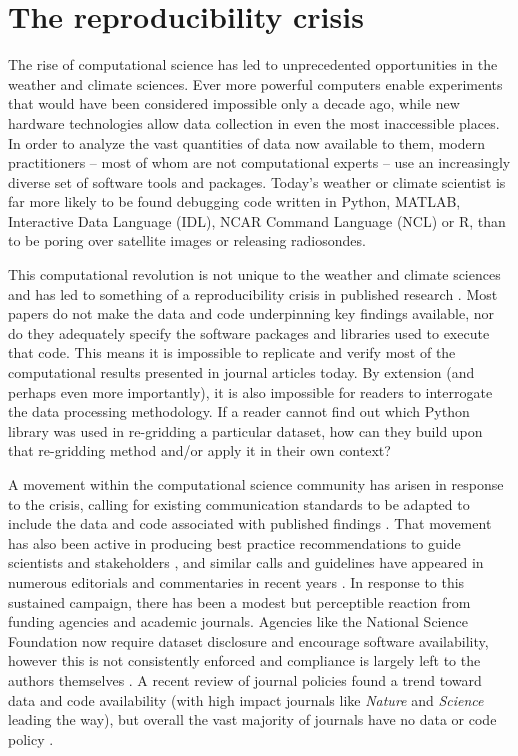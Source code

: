 \section{The reproducibility crisis}

The rise of computational science has led to unprecedented opportunities in the weather and climate sciences. Ever more powerful computers enable experiments that would have been considered impossible only a decade ago, while new hardware technologies allow data collection in even the most inaccessible places. In order to analyze the vast quantities of data now available to them, modern practitioners – most of whom are not computational experts – use an increasingly diverse set of software tools and packages. Today's weather or climate scientist is far more likely to be found debugging code written in Python, MATLAB, Interactive Data Language (IDL), NCAR Command Language (NCL) or R, than to be poring over satellite images or releasing radiosondes. 

This computational revolution is not unique to the weather and climate sciences and has led to something of a reproducibility crisis in published research \citep[e.g.][]{Peng2011}. Most papers do not make the data and code underpinning key findings available, nor do they adequately specify the software packages and libraries used to execute that code. This means it is impossible to replicate and verify most of the computational results presented in journal articles today. By extension (and perhaps even more importantly), it is also impossible for readers to interrogate the data processing methodology. If a reader cannot find out which Python library was used in re-gridding a particular dataset, how can they build upon that re-gridding method and/or apply it in their own context? 

A movement within the computational science community has arisen in response to the crisis, calling for existing communication standards to be adapted to include the data and code associated with published findings \citep[e.g.][]{Stodden2014}. That movement has also been active in producing best practice recommendations to guide scientists and stakeholders \citep[e.g.][]{Prlic2012,Stodden2012a,Sandve2013,Stodden2014}, and similar calls and guidelines have appeared in numerous editorials and commentaries in recent years \citep[e.g.][]{Barnes2010,Merali2010,Ince2012}. In response to this sustained campaign, there has been a modest but perceptible reaction from funding agencies and academic journals. Agencies like the National Science Foundation now require dataset disclosure and encourage software availability, however this is not consistently enforced and compliance is largely left to the authors themselves \citep{Stodden2013}. A recent review of journal policies found a trend toward data and code availability (with high impact journals like \textit{Nature} and \textit{Science} leading the way), but overall the vast majority of journals have no data or code policy \citep{Stodden2013}. 

